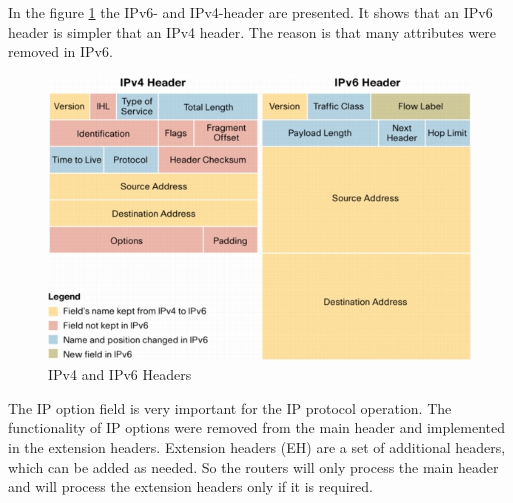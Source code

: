 \documentclass[a4paper]{report}
\begin{document}
In the figure \ref{fig:IPv4_IPv6_Header} the IPv6- and IPv4-header are presented. It shows that an IPv6 header is simpler that an IPv4 header. The reason is that many attributes were removed in IPv6.
\begin{figure}
	\centering
	\includegraphics[width=0.8\linewidth]{ipv6_ipv4_headers}%
	\caption {IPv4 and IPv6 Headers \parencite{cisco2006}}
	\label{fig:IPv4_IPv6_Header}
\end{figure}

The IP option field is very important for the IP protocol operation. The functionality of IP options were removed from the main header and implemented in the extension headers. Extension headers (EH) are a set of additional headers, which can be added as needed. So the routers will only process the main header and will process the extension headers only if it is required.
\end{document}
